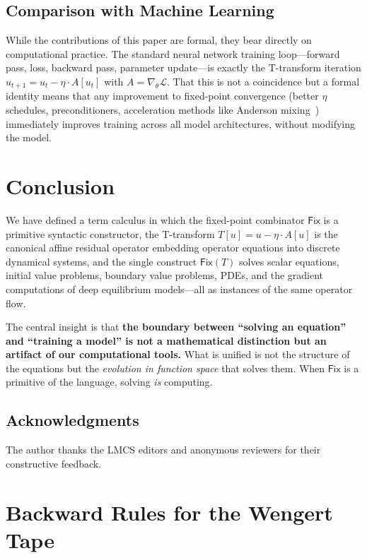\documentclass{lmcs}
\theoremstyle{plain}
\theoremstyle{definition}
\newcommand{\fix}{\mathsf{Fix}}
\begin{document}
\subsection{Comparison with Machine Learning}

While the contributions of this paper are formal, they bear directly on
computational practice. The standard neural network training loop---forward
pass, loss, backward pass, parameter update---is exactly the T-transform
iteration $u_{t+1} = u_t - \eta \cdot A[u_t]$ with $A = \nabla_\theta
\mathcal{L}$. That this is not a coincidence but a formal identity means that
any improvement to fixed-point convergence (better $\eta$ schedules,
preconditioners, acceleration methods like Anderson mixing~\cite{anderson1965})
immediately improves training across all model architectures, without
modifying the model.

\section{Conclusion}

We have defined a term calculus in which the fixed-point combinator $\fix$
is a primitive syntactic constructor, the T-transform
$T[u] = u - \eta \cdot A[u]$ is the canonical affine residual operator
embedding operator equations into discrete dynamical systems, and the single
construct $\fix(T)$ solves scalar equations, initial value problems, boundary
value problems, PDEs, and the gradient computations of deep equilibrium
models---all as instances of the same operator flow.

The central insight is that \textbf{the boundary between ``solving an
equation'' and ``training a model'' is not a mathematical distinction but an
artifact of our computational tools.} What is unified is not the structure of
the equations but the \emph{evolution in function space} that solves them. When
$\fix$ is a primitive of the language, solving \emph{is} computing.

\subsection*{Acknowledgments}
The author thanks the LMCS editors and anonymous reviewers for their
constructive feedback.

\appendix
\section{Backward Rules for the Wengert Tape}\label{sec:backward-rules}
\end{document}
